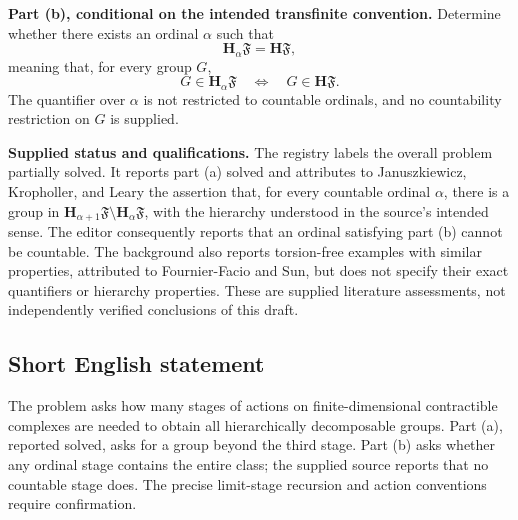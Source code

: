 \documentclass[11pt]{article}
\begin{document}
\textbf{Part (b), conditional on the intended transfinite convention.} Determine whether there exists an ordinal \(\alpha\) such that
\[
\mathbf H_\alpha\mathfrak F=\mathbf H\mathfrak F,
\]
meaning that, for every group \(G\),
\[
G\in\mathbf H_\alpha\mathfrak F
\quad\Longleftrightarrow\quad
G\in\mathbf H\mathfrak F.
\]
The quantifier over \(\alpha\) is not restricted to countable ordinals, and no countability restriction on \(G\) is supplied.

\textbf{Supplied status and qualifications.} The registry labels the overall problem partially solved. It reports part (a) solved and attributes to Januszkiewicz, Kropholler, and Leary the assertion that, for every countable ordinal \(\alpha\), there is a group in
\(\mathbf H_{\alpha+1}\mathfrak F\setminus\mathbf H_\alpha\mathfrak F\), with the hierarchy understood in the source's intended sense. The editor consequently reports that an ordinal satisfying part (b) cannot be countable. The background also reports torsion-free examples with similar properties, attributed to Fournier-Facio and Sun, but does not specify their exact quantifiers or hierarchy properties. These are supplied literature assessments, not independently verified conclusions of this draft.
\subsection{Short English statement}
The problem asks how many stages of actions on finite-dimensional contractible complexes are needed to obtain all hierarchically decomposable groups. Part (a), reported solved, asks for a group beyond the third stage. Part (b) asks whether any ordinal stage contains the entire class; the supplied source reports that no countable stage does. The precise limit-stage recursion and action conventions require confirmation.
\end{document}
